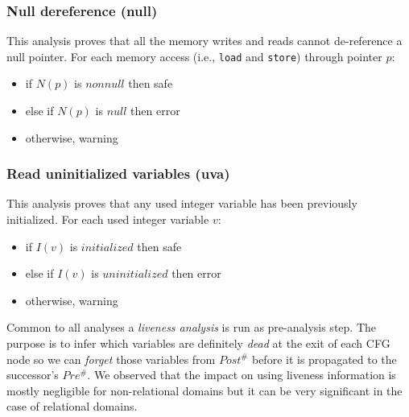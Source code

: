 \documentclass[a4]{article}
\newcommand{\ikospp}{\textsc{IkosPP}\xspace}
\begin{document}

\subsubsection{Null dereference (\textsf{null})}

This analysis proves that all the memory writes and reads cannot
de-reference a null pointer. For each memory access (i.e.,
\texttt{load} and \texttt{store}) through pointer $p$:

\begin{itemize}
\item if $N(p)$ is $nonnull$ then safe
\item else if $N(p)$ is $null$ then error
\item otherwise, warning
\end{itemize}

\subsubsection{Read uninitialized variables (\textsf{uva})}

This analysis proves that any used integer variable has been
previously initialized. For each used integer variable $v$:

\begin{itemize}
\item if $I(v)$ is $initialized$ then safe
\item else if $I(v)$ is $uninitialized$ then error
\item otherwise, warning

\end{itemize}



Common to all analyses a \emph{liveness analysis} is run as
pre-analysis step. The purpose is to infer which variables are
definitely \emph{dead} at the exit of each CFG node so we can
\emph{forget} those variables from $Post^{\#}$ before it is propagated
to the successor's $Pre^{\#}$. We observed that the impact on using
liveness information is mostly negligible for non-relational domains
but it can be very significant in the case of relational domains.
\end{document}
